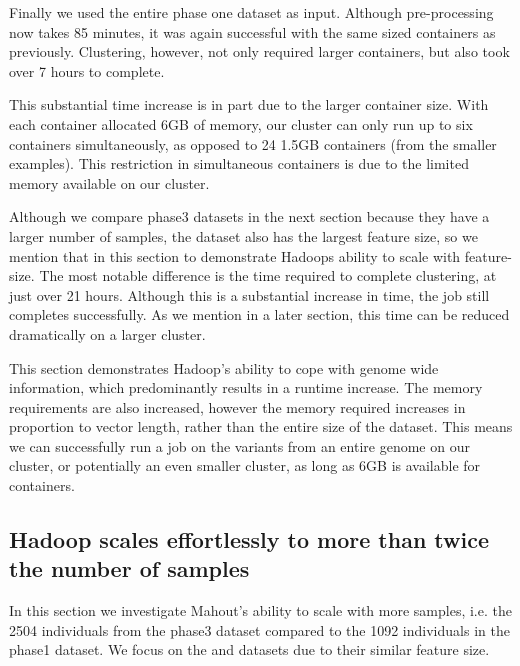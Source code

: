 \documentclass{bioinfo}
\begin{document}
Finally we used the entire phase one dataset as input. Although pre-processing now takes 85 minutes, it was again successful with the same sized containers as previously.
Clustering, however, not only required larger containers, but also took over 7 hours to complete.

This substantial time increase is in part due to the larger container size. With each container allocated 6GB of memory, our cluster can only run up to six containers simultaneously, as opposed to 24 1.5GB containers (from the smaller examples).
This restriction in simultaneous containers is due to the limited memory available on our cluster.

Although we compare phase3 datasets in the next section because they have a larger number of samples, the \FullPhasethree{} dataset also has the largest feature size, so we mention that in this section to demonstrate Hadoops ability to scale with feature-size.
The most notable difference is the time required to complete clustering, at just over 21 hours. Although this is a substantial increase in time, the job still completes successfully. As we mention in a later section, this time can be reduced dramatically on a larger cluster.

This section demonstrates Hadoop's ability to cope with genome wide information, which predominantly results in a runtime increase. The memory requirements are also increased, however the memory required increases in proportion to vector length,
rather than the entire size of the dataset. This means we can successfully run a job on the variants from an entire genome on our cluster, or potentially an even smaller cluster, as long as 6GB is available for containers.

\subsection*{Hadoop scales effortlessly to more than twice the number of samples}
In this section we investigate Mahout's ability to scale with more samples, i.e. the 2504 individuals from the phase3 dataset compared to the 1092 individuals in the phase1 dataset. We focus on the \SevenPhaseone{} and \ThreePhasethree{} datasets due to their similar feature size.
\end{document}
